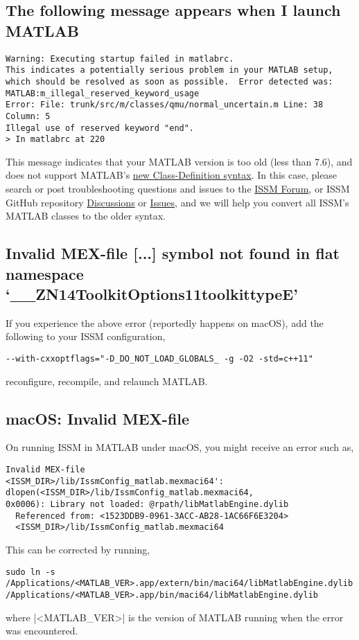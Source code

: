 \subsection*{The following message appears when I launch MATLAB}%
\begin{lstlisting}
Warning: Executing startup failed in matlabrc.
This indicates a potentially serious problem in your MATLAB setup,
which should be resolved as soon as possible.  Error detected was:
MATLAB:m_illegal_reserved_keyword_usage
Error: File: trunk/src/m/classes/qmu/normal_uncertain.m Line: 38
Column: 5
Illegal use of reserved keyword "end".
> In matlabrc at 220
\end{lstlisting}
This message indicates that your MATLAB version is too old (less than 7.6), and does not support MATLAB's \href{http://www.mathworks.com/help/matlab/matlab_oop/compatibility-with-previous-versions-.html}{new Class-Definition syntax}. In this case, please search or post troubleshooting questions and issues to the \href{https://issm.ess.uci.edu/forum/}{ISSM Forum}, or ISSM GitHub repository \href{https://github.com/ISSMteam/ISSM/discussions}{Discussions} or \href{https://github.com/ISSMteam/ISSM/issues}{Issues}, and we will help you convert all ISSM's MATLAB classes to the older syntax.
\subsection*{Invalid MEX-file [...] symbol not found in flat namespace `\_\_ZN14ToolkitOptions11toolkittypeE'}%
If you experience the above error (reportedly happens on macOS), add the following to your ISSM configuration,
\begin{lstlisting}
--with-cxxoptflags="-D_DO_NOT_LOAD_GLOBALS_ -g -O2 -std=c++11"
\end{lstlisting}
reconfigure, recompile, and relaunch MATLAB.
\subsection*{macOS: Invalid MEX-file}%
On running ISSM in MATLAB under macOS, you might receive an error such as,
\begin{lstlisting}
Invalid MEX-file
<ISSM_DIR>/lib/IssmConfig_matlab.mexmaci64':
dlopen(<ISSM_DIR>/lib/IssmConfig_matlab.mexmaci64,
0x0006): Library not loaded: @rpath/libMatlabEngine.dylib
  Referenced from: <1523DDB9-0961-3ACC-AB28-1AC66F6E3204>
  <ISSM_DIR>/lib/IssmConfig_matlab.mexmaci64
  \end{lstlisting}
This can be corrected by running,
\begin{lstlisting}
sudo ln -s /Applications/<MATLAB_VER>.app/extern/bin/maci64/libMatlabEngine.dylib /Applications/<MATLAB_VER>.app/bin/maci64/libMatlabEngine.dylib
\end{lstlisting}
where \lstinlinebg|<MATLAB_VER>| is the version of MATLAB running when the error was encountered.

\clearpage %
